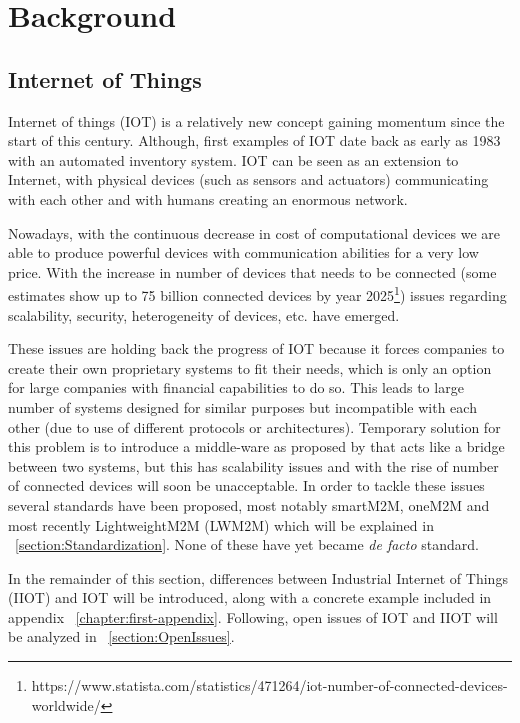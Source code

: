 \chapter{Background}
\label{chapter:background} 


\section{Internet of Things}

Internet of things (IOT) is a relatively new concept gaining momentum since the start of this century. Although, first examples
of IOT date back as early as 1983 with an automated inventory system. IOT can be seen as an extension to Internet, with physical devices (such as sensors and actuators) communicating with each other and with humans creating an enormous network.

Nowadays, with the continuous decrease in cost of computational devices 
we are able to produce powerful devices with communication abilities for a very low price. With the increase in number 
of devices that needs to be connected (some estimates show up to 75 billion connected devices by year 2025\footnote{https://www.statista.com/statistics/471264/iot-number-of-connected-devices-worldwide/}) issues regarding scalability, security, heterogeneity of devices, etc. have emerged. 

These issues are holding back the progress of IOT because it forces companies to create their own proprietary systems to fit their needs, which is only an option for
large companies with financial capabilities to do so. This leads to large number of systems designed for similar purposes but incompatible with each other (due to use of different protocols or architectures). Temporary solution for this problem is to introduce a middle-ware as proposed by \cite{Bandyopadhyay2011} that acts like a bridge between two systems, but this has scalability issues and with the rise of number of connected devices will soon be unacceptable. In order to tackle these issues several standards have been proposed, most notably smartM2M, oneM2M and most recently LightweightM2M (LWM2M) which will be explained in ~\ref{section:Standardization}. None of these have yet became \emph{de facto} standard.

In the remainder of this section, differences between Industrial Internet of Things (IIOT) and IOT will be introduced, along with a concrete example included in appendix 
~\ref{chapter:first-appendix}. 
Following, open issues of IOT and IIOT will be analyzed in ~\ref{section:OpenIssues}. 


